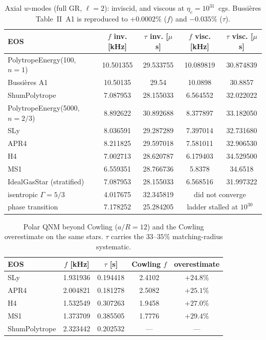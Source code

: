 \documentclass[aps,prd,preprint,amsmath,amssymb,nofootinbib,longbibliography]{revtex4-2}
\begin{document}
\begin{table}[htbp]
\caption{Axial $w$-modes (full GR, $\ell=2$): inviscid, and viscous at $\eta_c = 10^{31}$~cgs.
Bussi\`eres Table~II~A1 is reproduced to $+0.0002\%$ ($f$) and $-0.035\%$ ($\tau$).}
\label{tab:axial}
\footnotesize
\begin{ruledtabular}
\begin{tabular}{lcccc}
EOS & $f$ inv. [kHz] & $\tau$ inv. [$\mu$s] & $f$ visc. [kHz] & $\tau$ visc. [$\mu$s]\\
\hline
PolytropeEnergy(100, $n{=}1$) & 10.501355 & 29.533755 & 10.089819 & 30.874839\\
\quad Bussi\`eres A1          & 10.50135  & 29.54     & 10.0898   & 30.8857\\
ShumPolytrope & 7.087953 & 28.155033 & 6.564552 & 32.022022\\
PolytropeEnergy(5000, $n{=}2/3$) & 8.892622 & 30.892688 & 8.377897 & 33.182050\\
SLy  & 8.036591 & 29.287289 & 7.397014 & 32.731680\\
APR4 & 8.211825 & 29.597018 & 7.581011 & 32.906530\\
H4   & 7.002713 & 28.620787 & 6.179403 & 34.529500\\
MS1  & 6.559351 & 28.766736 & 5.8378   & 34.6518\\
IdealGasStar (stratified) & 7.087953 & 28.155033 & 6.568516 & 31.997322\\
isentropic $\Gamma=5/3$ & 4.017675 & 32.345819 & \multicolumn{2}{c}{did not converge}\\
phase transition & 7.178252 & 25.284205 & \multicolumn{2}{c}{ladder stalled at $10^{30}$}\\
\end{tabular}
\end{ruledtabular}
\end{table}

\begin{table}[htbp]
\caption{Polar QNM beyond Cowling ($a/R=12$) and the Cowling overestimate on the same stars.
$\tau$ carries the $33$--$35\%$ matching-radius systematic.}
\label{tab:polarGR}
\begin{ruledtabular}
\begin{tabular}{lcccc}
EOS & $f$ [kHz] & $\tau$ [s] & Cowling $f$ & overestimate\\
\hline
SLy  & 1.931936 & 0.194418 & 2.4102 & $+24.8\%$\\
APR4 & 2.004821 & 0.181278 & 2.5082 & $+25.1\%$\\
H4   & 1.532549 & 0.307263 & 1.9458 & $+27.0\%$\\
MS1  & 1.373709 & 0.385505 & 1.7776 & $+29.4\%$\\
ShumPolytrope & 2.323442 & 0.202532 & --- & ---\\
\end{tabular}
\end{ruledtabular}
\end{table}
\end{document}
